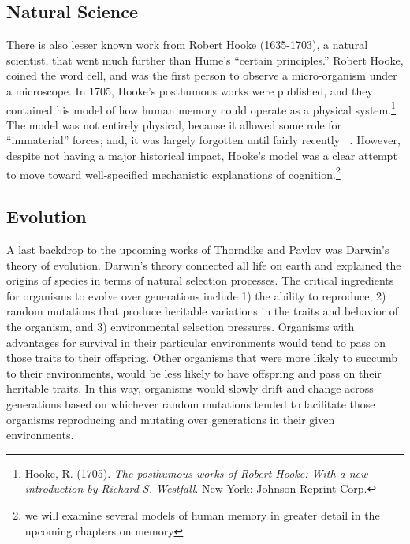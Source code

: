 \documentclass[
  oneside,
  12pt]{crumpbook}
\begin{document}
\hypertarget{natural-science}{%
\subsection{Natural Science}\label{natural-science}}

There is also lesser known work from Robert Hooke (1635-1703), a natural scientist, that went much further than Hume's ``certain principles.'' Robert Hooke, coined the word cell, and was the first person to observe a micro-organism under a microscope. In 1705, Hooke's posthumous works were published, and they contained his model of how human memory could operate as a physical system.\footnote{\protect\hyperlink{ref-hookePosthumousWorksRobert1705}{Hooke, R. (1705). \emph{The posthumous works of {Robert Hooke}: {With} a new introduction by {Richard S}. {Westfall}}. {New York: Johnson Reprint Corp}}.} The model was not entirely physical, because it allowed some role for ``immaterial'' forces; and, it was largely forgotten until fairly recently {[}{]}. However, despite not having a major historical impact, Hooke's model was a clear attempt to move toward well-specified mechanistic explanations of cognition.\footnote{we will examine several models of human memory in greater detail in the upcoming chapters on memory}

\hypertarget{evolution}{%
\subsection{Evolution}\label{evolution}}

A last backdrop to the upcoming works of Thorndike and Pavlov was Darwin's theory of evolution. Darwin's theory connected all life on earth and explained the origins of species in terms of natural selection processes. The critical ingredients for organisms to evolve over generations include 1) the ability to reproduce, 2) random mutations that produce heritable variations in the traits and behavior of the organism, and 3) environmental selection pressures. Organisms with advantages for survival in their particular environments would tend to pass on those traits to their offspring. Other organisms that were more likely to succumb to their environments, would be less likely to have offspring and pass on their heritable traits. In this way, organisms would slowly drift and change across generations based on whichever random mutations tended to facilitate those organisms reproducing and mutating over generations in their given environments.
\end{document}
